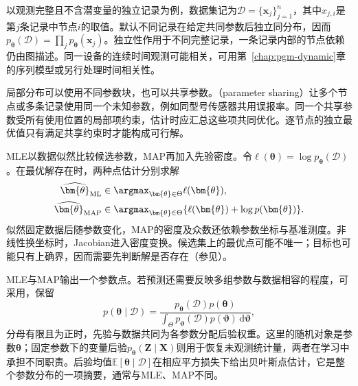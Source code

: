 以观测完整且不含潜变量的独立记录为例，数据集记为$\mathcal{D}=\{\bm{x}_j\}_{j=1}^n$，其中$x_{j,i}$是第$j$条记录中节点$i$的取值。默认不同记录在给定共同参数后独立同分布，因而$p_{\bm{\theta}}(\mathcal{D})=\prod_jp_{\bm{\theta}}(\bm{x}_j)$。独立性作用于不同完整记录，一条记录内部的节点依赖仍由图描述。同一设备的连续时间观测可能相关，可用第~\ref{chap:pgm-dynamic}章的序列模型或另行处理时间相关性。

局部分布可以使用不同参数块，也可以共享参数。（parameter sharing）让多个节点或多条记录使用同一个未知参数，例如同型号传感器共用误报率。同一个共享参数受所有使用位置的局部项约束，估计时应汇总这些项共同优化。逐节点的独立最优值只有满足共享约束时才能构成可行解。

MLE以数据似然比较候选参数，MAP再加入先验密度。令$\ell(\bm{\theta})=\log p_{\bm{\theta}}(\mathcal{D})$。在最优解存在时，两种点估计分别求解
\begin{equation}
  \begin{aligned}
    \widehat{\bm{\theta}}_{\mathrm{ML}}
      &\in\argmax_{\bm{\theta}\in\Theta}\ell(\bm{\theta}),\\
    \widehat{\bm{\theta}}_{\mathrm{MAP}}
      &\in\argmax_{\bm{\theta}\in\Theta}
        \{\ell(\bm{\theta})+\log p(\bm{\theta})\}.
  \end{aligned}
  \label{eq:pgm-parameter-learning-point-objectives}
\end{equation}
似然固定数据后随参数变化，MAP的密度及众数还依赖参数坐标与基准测度。非线性换坐标时，Jacobian进入密度变换。候选集上的最优点可能不唯一；目标也可能只有上确界，因而需要先判断解是否存在（参见）。

MLE与MAP输出一个参数点。若预测还需要反映多组参数与数据相容的程度，可采用，保留
\begin{equation}
  p(\bm{\theta}\mid\mathcal{D})
  =\frac{p_{\bm{\theta}}(\mathcal{D})p(\bm{\theta})}
  {\int_\Theta p_{\bm{\vartheta}}(\mathcal{D})
    p(\bm{\vartheta})\,\mathrm{d}\bm{\vartheta}},
  \label{eq:pgm-parameter-learning-parameter-posterior}
\end{equation}
分母有限且为正时，先验与数据共同为各参数分配后验权重。这里的随机对象是参数$\bm{\theta}$；固定参数下的变量后验$p_{\bm{\theta}}(\bm{Z}\mid\bm{X})$则用于恢复未观测统计量，两者在学习中承担不同职责。后验均值$\mathbb{E}[\bm{\theta}\mid\mathcal{D}]$在相应平方损失下给出贝叶斯点估计，它是整个参数分布的一项摘要，通常与MLE、MAP不同。

